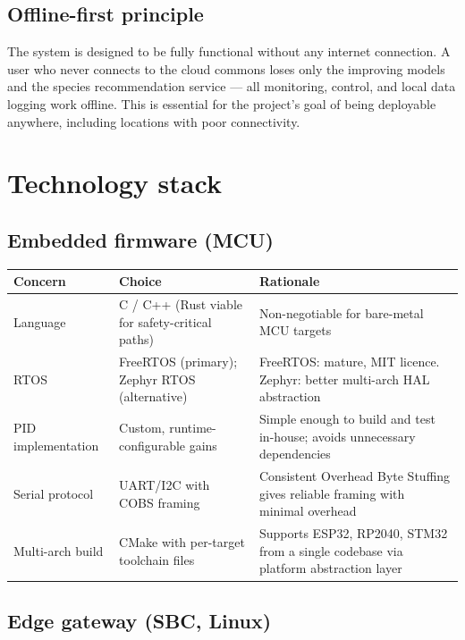 \subsection{Offline-first principle}

The system is designed to be fully functional without any internet connection. A user who never connects to the cloud commons loses only the improving models and the species recommendation service --- all monitoring, control, and local data logging work offline. This is essential for the project's goal of being deployable anywhere, including locations with poor connectivity.


\section{Technology stack}

\subsection{Embedded firmware (MCU)}

\begin{center}
\begin{tabular}{p{3.5cm}p{5cm}p{5cm}}
\toprule
\textbf{Concern} & \textbf{Choice} & \textbf{Rationale} \\
\midrule
Language & C / C++ (Rust viable for safety-critical paths) & Non-negotiable for bare-metal MCU targets \\
RTOS & FreeRTOS (primary); Zephyr RTOS (alternative) & FreeRTOS: mature, MIT licence. Zephyr: better multi-arch HAL abstraction \\
PID implementation & Custom, runtime-configurable gains & Simple enough to build and test in-house; avoids unnecessary dependencies \\
Serial protocol & UART/I2C with COBS framing & Consistent Overhead Byte Stuffing gives reliable framing with minimal overhead \\
Multi-arch build & CMake with per-target toolchain files & Supports ESP32, RP2040, STM32 from a single codebase via platform abstraction layer \\
\bottomrule
\end{tabular}
\end{center}

\subsection{Edge gateway (SBC, Linux)}

